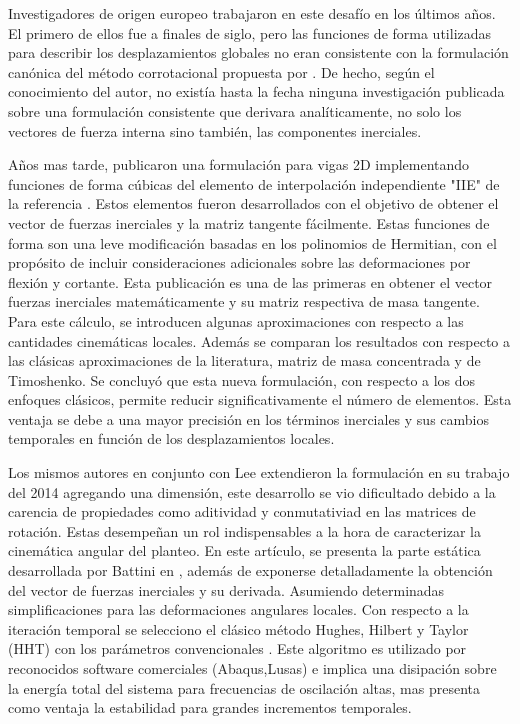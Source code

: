 Investigadores de origen europeo trabajaron en este desafío en los últimos años. El primero de ellos fue \cite{behdinan1998co} a finales de siglo, pero las funciones de forma utilizadas para describir los desplazamientos globales no eran consistente con la formulación canónica del método corrotacional propuesta por \textcite{simo1988dynamics}. De hecho, según el conocimiento del autor, no existía hasta la fecha ninguna investigación publicada sobre una formulación consistente que derivara analíticamente, no solo los vectores de fuerza interna sino también, las componentes inerciales.   

Años mas tarde, \cite{Le2011} publicaron una formulación para vigas 2D implementando funciones de forma cúbicas del elemento de interpolación independiente "IIE" de la referencia \cite{reddy1997locking}. Estos elementos fueron desarrollados con el objetivo de obtener el vector de fuerzas inerciales y la matriz tangente fácilmente. Estas funciones de forma son una leve modificación basadas en los polinomios de Hermitian, con el propósito de incluir consideraciones adicionales sobre las deformaciones por flexión y cortante. Esta publicación es una de las primeras en obtener el vector fuerzas inerciales matemáticamente y su matriz respectiva de masa tangente. Para este cálculo, se introducen algunas aproximaciones con respecto a las cantidades cinemáticas locales. Además se comparan los resultados con respecto a las clásicas aproximaciones de la literatura, matriz de masa concentrada y de Timoshenko. Se concluyó que esta nueva formulación, con respecto a los dos enfoques clásicos,  permite reducir significativamente el número de elementos. Esta ventaja se debe a una mayor precisión en los términos inerciales y sus cambios temporales en función de los desplazamientos locales.    

Los mismos autores en conjunto con Lee extendieron la formulación en su trabajo del 2014 \cite{Le2014} agregando una dimensión, este desarrollo se vio dificultado debido a la carencia de propiedades como aditividad y conmutativiad en las matrices de rotación. Estas desempeñan un rol indispensables a la hora de caracterizar la cinemática angular del planteo. En este artículo, se presenta la parte estática desarrollada por Battini en \cite{Battini2002}, además de exponerse detalladamente la obtención del vector de fuerzas inerciales y su derivada. Asumiendo determinadas simplificaciones para las deformaciones angulares locales. Con respecto a la iteración temporal se selecciono el clásico método Hughes, Hilbert y Taylor (HHT) con los parámetros convencionales \citep{hilber1977improved}. Este algoritmo es utilizado por reconocidos software comerciales (Abaqus,Lusas) e implica una disipación sobre la energía total del sistema para frecuencias de oscilación altas, mas presenta como ventaja la estabilidad para grandes incrementos temporales. 

